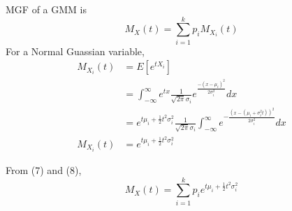 \documentclass[12pt]{article}
\begin{document}
\begin{enumerate}
MGF of a GMM is
\begin{equation}
    M_X(t) = \sum_{i=1}^{k} p_iM_X_i(t)
\end{equation}
For a Normal Guassian variable,
\begin{equation}
\begin{split}
    M_X_i(t)& = E[e^{tX_i}] \\
    & = \int_{-\infty}^{\infty} e^{tx} \frac{1}{\sqrt{2\pi}\sigma_i}e^{\frac{-(x-\mu_i)^2}{2\sigma_i^2}}dx \\
    & = e^{t\mu_i + \frac{1}{2}t^2\sigma_i^2}\frac{1}{\sqrt{2\pi}\sigma_i} \int_{-\infty}^{\infty} e^{-\frac{(x-(\mu_i+\sigma_i^2t))^2}{2\sigma_i^2}}dx \\
    M_X_i(t)& = e^{t\mu_i + \frac{1}{2}t^2\sigma_i^2}
\end{split}
\end{equation} 

From (7) and (8),
\begin{equation}
    M_X(t) = \sum_{i=1}^k p_ie^{t\mu_i + \frac{1}{2}t^2\sigma_i^2}
\end{equation}
\end{enumerate}
\end{document}
